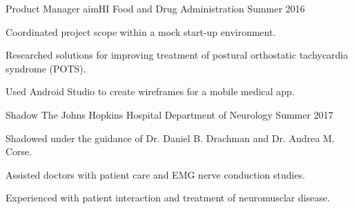 

\begin{cventries}

  \cventry
    {Product Manager} %
    {aimHI} %
    {Food and Drug Administration} %
    {Summer 2016} %
    {
      \begin{cvitems} %
        \item {Coordinated project scope within a mock start-up environment.}
        \item {Researched solutions for improving treatment of postural orthostatic tachycardia syndrome (POTS).}
        \item {Used Android Studio to create wireframes for a mobile medical app.}
      \end{cvitems}
    }

  \cventry
    {Shadow} %
    {The Johns Hopkins Hospital} %
    {Department of Neurology} %
    {Summer 2017} %
    {
      \begin{cvitems} %
        \item {Shadowed under the guidance of Dr. Daniel B. Drachman and Dr. Andrea M. Corse.}
        \item {Assisted doctors with patient care and EMG nerve conduction studies.}
        \item {Experienced with patient interaction and treatment of neuromusclar disease.}
      \end{cvitems}
    }

\end{cventries}
